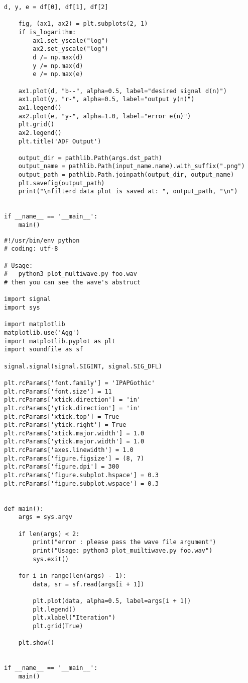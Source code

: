 \begin{lstlisting}[caption=plot\_from\_csv.py,label=plot_from_csv.py]
    d, y, e = df[0], df[1], df[2]

    fig, (ax1, ax2) = plt.subplots(2, 1)
    if is_logarithm:
        ax1.set_yscale("log")
        ax2.set_yscale("log")
        d /= np.max(d)
        y /= np.max(d)
        e /= np.max(e)

    ax1.plot(d, "b--", alpha=0.5, label="desired signal d(n)")
    ax1.plot(y, "r-", alpha=0.5, label="output y(n)")
    ax1.legend()
    ax2.plot(e, "y-", alpha=1.0, label="error e(n)")
    plt.grid()
    ax2.legend()
    plt.title('ADF Output')

    output_dir = pathlib.Path(args.dst_path)
    output_name = pathlib.Path(input_name.name).with_suffix(".png")
    output_path = pathlib.Path.joinpath(output_dir, output_name)
    plt.savefig(output_path)
    print("\nfilterd data plot is saved at: ", output_path, "\n")


if __name__ == '__main__':
    main()
\end{lstlisting}

\begin{lstlisting}[caption=plot\_multiwave.py,label=plot_multiwave.py]
#!/usr/bin/env python
# coding: utf-8

# Usage:
#   python3 plot_multiwave.py foo.wav
# then you can see the wave's abstruct

import signal
import sys

import matplotlib
matplotlib.use('Agg')
import matplotlib.pyplot as plt
import soundfile as sf

signal.signal(signal.SIGINT, signal.SIG_DFL)

plt.rcParams['font.family'] = 'IPAPGothic'
plt.rcParams['font.size'] = 11
plt.rcParams['xtick.direction'] = 'in'
plt.rcParams['ytick.direction'] = 'in'
plt.rcParams['xtick.top'] = True
plt.rcParams['ytick.right'] = True
plt.rcParams['xtick.major.width'] = 1.0
plt.rcParams['ytick.major.width'] = 1.0
plt.rcParams['axes.linewidth'] = 1.0
plt.rcParams['figure.figsize'] = (8, 7)
plt.rcParams['figure.dpi'] = 300
plt.rcParams['figure.subplot.hspace'] = 0.3
plt.rcParams['figure.subplot.wspace'] = 0.3


def main():
    args = sys.argv

    if len(args) < 2:
        print("error : please pass the wave file argument")
        print("Usage: python3 plot_muiltiwave.py foo.wav")
        sys.exit()

    for i in range(len(args) - 1):
        data, sr = sf.read(args[i + 1])

        plt.plot(data, alpha=0.5, label=args[i + 1])
        plt.legend()
        plt.xlabel("Iteration")
        plt.grid(True)

    plt.show()


if __name__ == '__main__':
    main()
\end{lstlisting}

